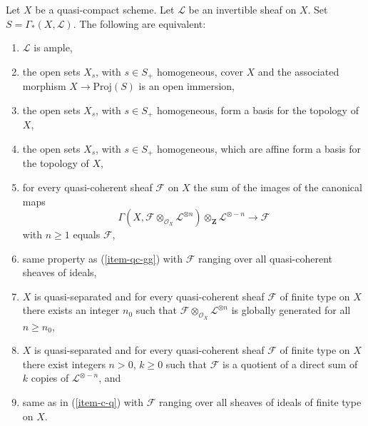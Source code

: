 %

\begin{proposition}
\label{proposition-characterize-ample}
Let $X$ be a quasi-compact scheme.
Let $\mathcal{L}$ be an invertible sheaf on $X$.
Set $S = \Gamma_*(X, \mathcal{L})$.
The following are equivalent:
\begin{enumerate}
\item
\label{item-ample}
$\mathcal{L}$ is ample,
\item
\label{item-immersion}
the open sets $X_s$, with $s \in S_{+}$ homogeneous,
cover $X$ and the associated morphism $X \to \text{Proj}(S)$
is an open immersion,
\item
\label{item-s-basis}
the open sets $X_s$, with $s \in S_{+}$ homogeneous,
form a basis for the topology of $X$,
\item
\label{item-s-affine-basis}
the open sets $X_s$, with $s \in S_{+}$ homogeneous,
which are affine form a basis for the topology of $X$,
\item
\label{item-qc-gg}
for every quasi-coherent sheaf $\mathcal{F}$ on $X$
the sum of the images of the canonical maps
$$
\Gamma(X, \mathcal{F} \otimes_{\mathcal{O}_X} \mathcal{L}^{\otimes n})
\otimes_{\mathbf{Z}} \mathcal{L}^{\otimes -n}
\longrightarrow
\mathcal{F}
$$
with $n \geq 1$ equals $\mathcal{F}$,
\item
\label{item-qc-i-gg}
same property as (\ref{item-qc-gg}) with $\mathcal{F}$
ranging over all quasi-coherent sheaves of ideals,
\item
\label{item-c-gg}
$X$ is quasi-separated and
for every quasi-coherent sheaf $\mathcal{F}$ of finite type on $X$
there exists an integer $n_0$ such that
$\mathcal{F} \otimes_{\mathcal{O}_X} \mathcal{L}^{\otimes n}$
is globally generated for all $n \geq n_0$,
\item
\label{item-c-q}
$X$ is quasi-separated and
for every quasi-coherent sheaf $\mathcal{F}$ of finite type on $X$
there exist integers $n > 0$, $k \geq 0$ such that
$\mathcal{F}$ is a quotient of a direct sum of $k$ copies of
$\mathcal{L}^{\otimes - n}$, and
\item
\label{item-c-i-q}
same as in (\ref{item-c-q}) with $\mathcal{F}$ ranging over all
sheaves of ideals of finite type on $X$.
\end{enumerate}
\end{proposition}

